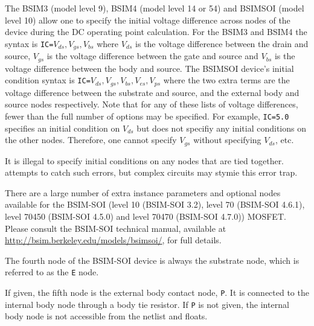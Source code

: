\begin{Device}
\begin{Parameters}

The BSIM3 (model level 9), BSIM4 (model level 14 or 54) and BSIMSOI (model
level 10) allow one to specify the initial voltage difference across
nodes of the device during the DC operating point calculation.  For the
BSIM3 and BSIM4 the syntax is \texttt{IC=$V_{ds}, V_{gs}, V_{bs}$}
where $V_{ds}$ is the voltage difference between the drain and source,
$V_{gs}$ is the voltage difference between the gate and source and
$V_{bs}$ is the voltage difference between the body and source.  The
BSIMSOI device's initial condition syntax is \texttt{IC=$V_{ds},
  V_{gs}, V_{bs}, V_{es}, V_{ps}$} where the two extra terms are the
voltage difference between the substrate and source, and the external
body and source nodes respectively.  Note that for any of these lists of
voltage differences, fewer than the full number of options may be
specified.  For example, \texttt{IC=5.0} specifies an initial condition on $V_{ds}$
but does not specifiy any initial conditions on the other nodes.
Therefore, one cannot specify $V_{gs}$ without specifying $V_{ds}$, etc.

It is illegal to specify initial conditions on any nodes that are tied
together.  \Xyce{} attempts to catch such errors, but complex circuits may
stymie this error trap.

\end{Parameters}

\vbox{\hrulefill}
\item[BSIM-SOI Options]

There are a large number of extra instance parameters and optional
nodes available for the BSIM-SOI (level 10 (BSIM-SOI 3.2), level 70
(BSIM-SOI 4.6.1), level 70450 (BSIM-SOI 4.5.0) 
and level 70470 (BSIM-SOI 4.7.0)) MOSFET.  Please
consult the BSIM-SOI technical manual, available at
\url{http://bsim.berkeley.edu/models/bsimsoi/}, for full details.

\begin{Parameters}


The fourth node of the BSIM-SOI device is always the substrate node,
which is referred to as the \texttt{E} node. 


If given, the fifth node is the external body contact node,
\texttt{P}.  It is connected to the internal body node through a body
tie resistor.  If \texttt{P} is not given, the internal body node is
not accessible from the netlist and floats.


\end{Parameters}
\end{Device}
